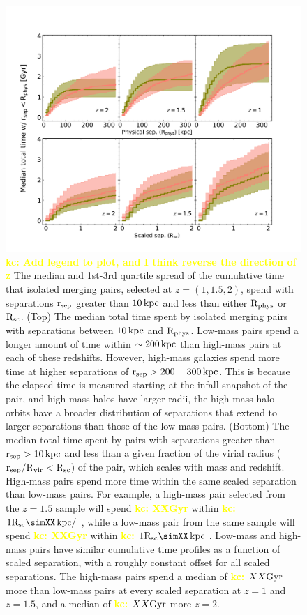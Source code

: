 \documentclass[twocolumn]{aastex631}
\newcommand{\kc}[1]{\textcolor{yellow}{\textbf{kc: #1}} }
\newcommand{\rsep}{\ensuremath{\rm r_{sep}}}
\newcommand{\Rvir}{\ensuremath{\rm R_{vir}}}
\newcommand{\Rphys}{\ensuremath{\rm R_{phys}}}
\newcommand{\Rsc}{\ensuremath{\rm R_{sc}}}
\newcommand{\rsep}{\ensuremath{\rm r_{sep}}}
\begin{document}
\begin{figure}[htb]
    \centering
    \includegraphics[width=\textwidth]{plots/bet-on-it/2_medtotal_PhScT_int.pdf}
    \caption{\kc{Add legend to plot, and I think reverse the direction of z} 
    The median and 1st-3rd quartile spread of the cumulative time that isolated merging pairs, selected at $z=(1,1.5,2)$, spend with separations \rsep{} greater than $10\mathrm{\,kpc}$ and less than either \Rphys{} or \Rsc{}.
    (Top) The median total time spent by isolated merging pairs with separations between $10\mathrm{\,kpc}$ and \Rphys{}.
    Low-mass pairs spend a longer amount of time within $\sim200\mathrm{\,kpc}$ than high-mass pairs at each of these redshifts. 
    However, high-mass galaxies spend more time at higher separations of $\rsep>200-300\kpc$. This is because the elapsed time is measured starting at the infall snapshot of the pair, and high-mass halos have larger radii, the high-mass halo orbits have a broader distribution of separations that extend to larger separations than those of the low-mass pairs.
    (Bottom) The median total time spent by pairs with separations greater than $\rsep>10\kpc$ and less than a given fraction of the virial radius ($\rsep/\Rvir<\Rsc$) of the pair, which scales with mass and redshift.  
    High-mass pairs spend more time within the same scaled separation than low-mass pairs. For example, a high-mass pair selected from the $z=1.5$ sample will spend \kc{XXGyr} within \kc{$1\Rsc\simXX\kpc/$}, while a low-mass pair from the same sample will spend \kc{XXGyr} within \kc{$1\Rsc\simXX\kpc$}. 
    Low-mass and high-mass pairs have similar cumulative time profiles as a function of scaled separation, with a roughly constant offset for all scaled separations. 
    The high-mass pairs spend a median of \kc{$XX\mathrm{Gyr}$} more than low-mass pairs at every scaled separation at $z=1$ and $z=1.5$, and a median of \kc{$XX\mathrm{Gyr}$} more $z=2$.
    }
    \label{fig:phys-vs-scaled}
\end{figure}
\end{document}
